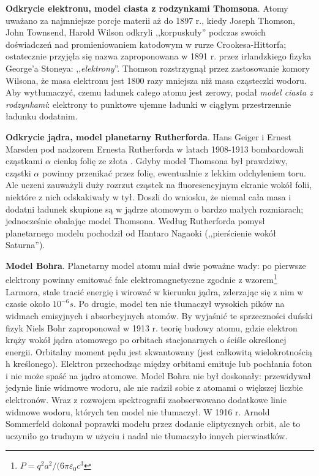 \textbf{Odkrycie elektronu, model ciasta z rodzynkami Thomsona}.
Atomy uważano za najmniejsze porcje materii aż do 1897 r., kiedy Joseph Thomson, John Townsend, Harold Wilson odkryli ,,korpuskuły'' podczas swoich doświadczeń nad promieniowaniem katodowym w rurze Crookesa-Hittorfa; ostatecznie przyjęła się nazwa zaproponowana w 1891 r. przez irlandzkiego fizyka George'a Stoneya: ,,\emph{elektrony}''.
%
%
%
%
Thomson rozstrzygnął przez zastosowanie komory Wilsona, że masa elektronu jest 1800 razy mniejsza niż masa cząsteczki wodoru.
%
Aby wytłumaczyć, czemu ładunek całego atomu jest zerowy, podał \emph{model ciasta z rodzynkami}: elektrony to punktowe ujemne ładunki w ciągłym przestrzennie ładunku dodatnim.

\textbf{Odkrycie jądra, model planetarny Rutherforda}.
Hans Geiger i Ernest Marsden pod nadzorem Ernesta Rutherforda w latach 1908-1913 bombardowali cząstkami $\alpha$ cienką folię ze złota .
%
%
Gdyby model Thomsona był prawdziwy, cząstki $\alpha$ powinny przenikać przez folię, ewentualnie z lekkim odchyleniem toru.
Ale uczeni zauważyli duży rozrzut cząstek na fluoresencyjnym ekranie wokół folii, niektóre z nich odskakiwały w tył.
Doszli do wniosku, że niemal cała masa i dodatni ładunek skupione są w jądrze atomowym o bardzo małych rozmiarach; jednocześnie obalając model Thomsona.
Według Rutherforda pomysł planetarnego modelu pochodził od Hantaro Nagaoki (,,pierścienie wokół Saturna'').

\textbf{Model Bohra}.
Planetarny model atomu miał dwie poważne wady: po pierwsze elektrony powinny emitować fale elektromagnetyczne zgodnie z wzorem\footnote{$P = q^2a^2/(6\pi\varepsilon_0 c^3$} Larmora, stale tracić energię i wirować w kierunku jądra, zderzając się z nim w czasie około $10^{-6} s$.
Po drugie, model ten nie tłumaczył wysokich pików na widmach emisyjnych i absorbcyjnych atomów.
By wyjaśnić te sprzeczności duński fizyk Niels Bohr zaproponował w 1913 r. teorię budowy atomu, gdzie elektron krąży wokół jądra atomowego po orbitach stacjonarnych o ściśle określonej energii.
%
Orbitalny moment pędu jest skwantowany (jest całkowitą wielokrotnością h kreślonego).
Elektron przechodząc między orbitami emituje lub pochłania foton i nie może spaść na jądro atomowe.
Model Bohra nie był doskonały: przewidywał jedynie linie widmowe wodoru, ale nie radził sobie z atomami o większej liczbie elektronów.
Wraz z rozwojem spektrografii zaobserwowano dodatkowe linie widmowe wodoru, których ten model nie tłumaczył.
W 1916 r. Arnold Sommerfeld dokonał poprawki modelu przez dodanie eliptycznych orbit, ale to uczyniło go trudnym w użyciu i nadal nie tłumaczyło innych pierwiastków.
%

